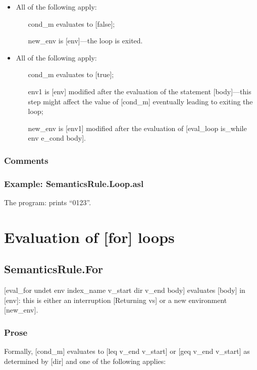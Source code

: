 \documentclass{book}
\begin{document}
    \begin{itemize}
    \item All of the following apply:
      \begin{itemize}
      \item [cond\_m] evaluates to [false];
      \item [new\_env] is [env]---the loop is exited. 
      \end{itemize}
    \item All of the following apply:
      \begin{itemize}
      \item [cond\_m] evaluates to [true];
      \item [env1] is [env] modified after the evaluation of the statement
       [body]---this step might affect the value of [cond\_m] eventually leading
       to exiting the loop;
      \item [new\_env] is [env1] modified after the evaluation of [eval\_loop
        is\_while env e\_cond body].
      \end{itemize}
    \end{itemize}

    \subsection{Comments}

    \subsection{Example: SemanticsRule.Loop.asl}
    The program:
    prints ``0123''.

\chapter{Evaluation of [for] loops \label{chap:eval_for}} 

\section{SemanticsRule.For \label{sec:SemanticsRule.For}}
[eval\_for undet env index\_name v\_start dir v\_end body] evaluates [body] in
[env]: this is either an interruption [Returning vs] or a new environment
[new\_env].

    \subsection{Prose}
    Formally, [cond\_m] evaluates to [leq v\_end v\_start] or [geq v\_end v\_start]
    as determined by [dir] and one of the following applies:
\end{document}
